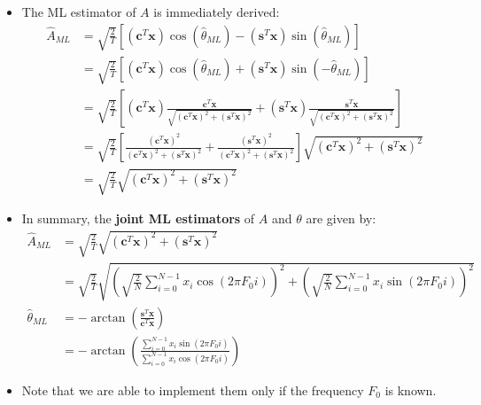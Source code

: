 \begin{itemize}
\[
\text{with} \quad \mathbf{c}^T\mathbf{x} = \mathbf{c}_{op}^T\mathbf{x}, \qquad
\mathbf{s}^T\mathbf{x} = \mathbf{s}_{op}^T\mathbf{x}
\]
    \item The ML estimator of \(A\) is immediately derived:
    \[
\begin{aligned}
\hat{A}_{ML} &= \sqrt{\frac{2}{T}}
    \left[
        (\mathbf{c}^T\mathbf{x})\cos(\hat{\theta}_{ML})
        - (\mathbf{s}^T\mathbf{x})\sin(\hat{\theta}_{ML})
    \right]\\
&= \sqrt{\frac{2}{T}}
    \left[
        (\mathbf{c}^T\mathbf{x})\cos(\hat{\theta}_{ML})
        + (\mathbf{s}^T\mathbf{x})\sin(-\hat{\theta}_{ML})
    \right]\\
&= \sqrt{\frac{2}{T}}
    \left[
        (\mathbf{c}^T\mathbf{x}) \frac{\mathbf{c}^T\mathbf{x}}{ \sqrt{ (\mathbf{c}^T\mathbf{x})^2 + (\mathbf{s}^T\mathbf{x})^2 } }
        + (\mathbf{s}^T\mathbf{x}) \frac{\mathbf{s}^T\mathbf{x}}{ \sqrt{ (\mathbf{c}^T\mathbf{x})^2 + (\mathbf{s}^T\mathbf{x})^2 } }
    \right]\\
&= \sqrt{\frac{2}{T}}
    \left[
        \frac{(\mathbf{c}^T\mathbf{x})^2}{ (\mathbf{c}^T\mathbf{x})^2 + (\mathbf{s}^T\mathbf{x})^2 }
        + \frac{(\mathbf{s}^T\mathbf{x})^2}{ (\mathbf{c}^T\mathbf{x})^2 + (\mathbf{s}^T\mathbf{x})^2 }
    \right] \sqrt{ (\mathbf{c}^T\mathbf{x})^2 + (\mathbf{s}^T\mathbf{x})^2 }\\
&= \sqrt{\frac{2}{T}} \sqrt{ (\mathbf{c}^T\mathbf{x})^2 + (\mathbf{s}^T\mathbf{x})^2 }
\end{aligned}
\]
    \item In summary, the \textbf{joint ML estimators} of \(A\) and \(\theta\) are given by:
\[
\begin{aligned}
\hat{A}_{ML} &= \sqrt{\frac{2}{T}}
    \sqrt{(\mathbf{c}^T \mathbf{x})^2 + (\mathbf{s}^T \mathbf{x})^2}\\[5pt]
&= \sqrt{\frac{2}{T}}
    \sqrt{
        \left(
            \sqrt{\frac{2}{N}} \sum_{i=0}^{N-1} x_i \cos(2\pi F_0 i)
        \right)^2
        +
        \left(
            \sqrt{\frac{2}{N}} \sum_{i=0}^{N-1} x_i \sin(2\pi F_0 i)
        \right)^2
    }\\[5pt]
\hat{\theta}_{ML}
&= -\arctan\left(
    \frac{\mathbf{s}^T \mathbf{x}}{\mathbf{c}^T \mathbf{x}}
\right)\\[5pt]
&= -\arctan\left(
    \frac{\sum_{i=0}^{N-1} x_i \sin(2\pi F_0 i)}{\sum_{i=0}^{N-1} x_i \cos(2\pi F_0 i)}
\right)
\end{aligned}
\]
    \item Note that we are able to implement them only if the frequency \(F_0\) is known.

\end{itemize}
